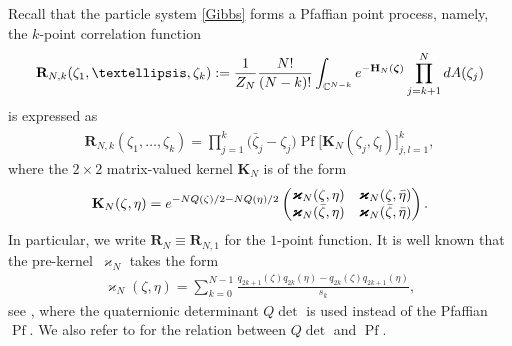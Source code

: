 \documentclass[11pt]{article}
\numberwithin{equation}{section}
\numberwithin{equation}{section}
\newcommand{\bfR}{\mathbf{R}}
\newcommand{\bfH}{{\mathbf H}}
\newcommand{\bfK}{{\mathbf K}}
\newcommand{\bfkappa}{{\bm \varkappa}}
\newcommand{\C}{{\mathbb C}}
\newcommand{\1}{\chi}
\newcommand{\Pf}{{\operatorname{Pf}}}
\begin{document}
Recall that the particle system \eqref{Gibbs} forms a Pfaffian point process, namely, the $k$-point correlation function
\begin{gather} \label{bfRNk def}
	\bfR_{N,k}(\zeta_1,\dots,\zeta_k):=\frac{1}{Z_N} \frac{N!}{(N-k)!} \int_{ \C^{N-k} } {\rm e}^{- \bfH_N( \boldsymbol{\zeta} ) } \prod_{j=k+1}^N {\rm d}A(\zeta_j)
\end{gather}
is expressed as
\begin{gather} \label{bfRNk Pf}
	\bfR_{N,k}(\zeta_1,\dots, \zeta_k)= \prod_{j=1}^{k} \big(\bar{\zeta}_j-\zeta_j\big) \Pf \big[ \bfK_{N}(\zeta_j,\zeta_l) \big]_{ j,l=1 }^k,
\end{gather}
where the $2 \times 2$ matrix-valued kernel $\bfK_N$ is of the form
\begin{gather} \label{bfK Pf}
	\bfK_N(\zeta,\eta)={\rm e}^{ -NQ(\zeta)/2-NQ(\eta)/2 }
	\begin{pmatrix}
		\bfkappa_N(\zeta,\eta) & \bfkappa_N(\zeta,\bar{\eta}) \\
		\bfkappa_N(\bar{\zeta},\eta) & \bfkappa_N(\bar{\zeta},\bar{\eta})
	\end{pmatrix}.
\end{gather}
In particular, we write $\bfR_{N} \equiv \bfR_{N,1}$ for the $1$-point function.
It is well known that the pre-kernel~$\bfkappa_N$ takes the form
\begin{gather} \label{bfkappaN}
	\bfkappa_N(\zeta,\eta)=\sum_{k=0}^{N-1} \frac{q_{2k+1}(\zeta) q_{2k}(\eta) -q_{2k}(\zeta) q_{2k+1}(\eta)}{s_k},
\end{gather}
see \cite{MR1928853}, where the quaternionic determinant $Q\det$ is used instead of the Pfaffian $\Pf$. We also refer to \cite{Mehta} for the relation between $Q\det$ and $\Pf$.
\end{document}
